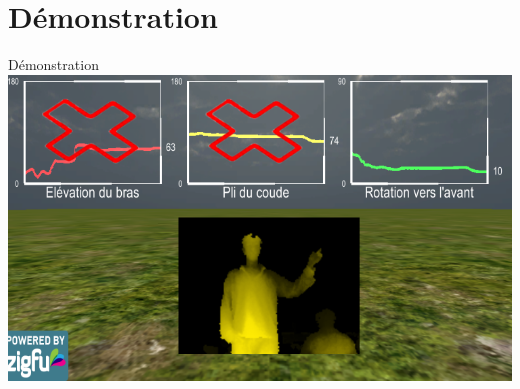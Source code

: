 \section{Démonstration}

\begin{frame}{Démonstration}
\centering \includegraphics[width=0.9\linewidth]{../images/zfm_graph}
\end{frame}